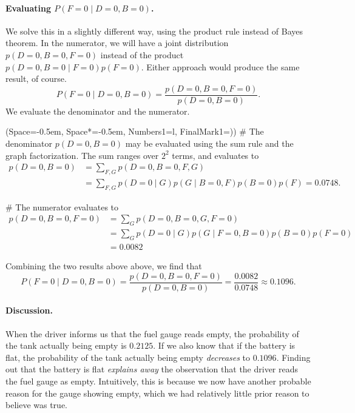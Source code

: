 \documentclass[12pt, a4paper]{article}
\newcommand{\listSpace}{-0.5em}%
\begin{document}
\paragraph{Evaluating $P(F=0 \mid D = 0, B=0)$.}
We solve this in a slightly different way, using the product rule instead of Bayes theorem.
In the numerator, we will have a joint distribution $p(D = 0, B=0, F =0)$ instead of the product $p(D = 0, B=0 \mid F =0) p(F =0)$.
Either approach would produce the same result, of course.
\begin{equation*}
P(F=0 \mid D = 0, B=0) = \frac{p(D = 0, B=0, F =0)}{p( D = 0, B=0)}.
\end{equation*}
We evaluate the denominator and the numerator.
\begin{easylist}[enumerate]
	\ListProperties(Space=\listSpace, Space*=\listSpace, Numbers1=l, FinalMark1={)})
	# The denominator $p( D = 0, B=0)$ may be evaluated using the sum rule and the graph factorization.
	The sum ranges over $2^2$ terms, and evaluates to
	\begin{align*}
	p( D = 0, B=0) &= \sum_{F, G} p( D = 0, B = 0, F, G) \\
	&= \sum_{F, G} p( D = 0 \mid G) p( G \mid B = 0, F) p(B=0) p (F)
	= 0.0748.
	\end{align*}

	# The numerator evaluates to
	\begin{align*}
	p(D = 0, B=0, F =0) 
	&= \sum_{G} p(D=0, B=0, G, F = 0) \\
	&= \sum_{G} p(D = 0 \mid G) p(G \mid F =0, B=0) p(B=0) p(F=0) \\
	&= 0.0082
	\end{align*}
\end{easylist}
Combining the two results above above, we find that
\begin{equation*}
P(F=0 \mid D = 0, B=0) = \frac{p(D = 0, B=0, F =0)}{p( D = 0, B=0)}
=
\frac{0.0082}{0.0748} \approx 0.1096.
\end{equation*}

\paragraph{Discussion.} 
When the driver informs us that the fuel gauge reads empty, the probability of the tank actually being empty is $0.2125$.
If we also know that if the battery is flat, the probability of the tank actually being empty \emph{decreases} to $0.1096$.
Finding out that the battery is flat \emph{explains away} the observation that the driver reads the fuel gauge as empty.
Intuitively, this is because we now have another probable reason for the gauge showing empty, which we had relatively little prior reason to believe was true.
\end{document}
